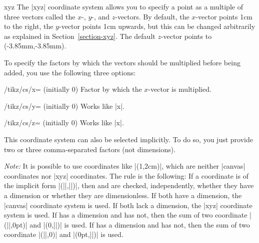 \begin{coordinatesystem}{xyz}
    The |xyz| coordinate system allows you to specify a point as a multiple of
    three vectors called the $x$-, $y$-, and $z$-vectors. By default, the
    $x$-vector points 1cm to the right, the $y$-vector points 1cm upwards, but
    this can be changed arbitrarily as explained in Section~\ref{section-xyz}.
    The default $z$-vector points to
    (-3.85mm,-3.85mm).

    To specify the factors by which the vectors should be multiplied before
    being added, you use the following three options:
    \begin{key}{/tikz/cs/x= (initially 0)}
        Factor by which the $x$-vector is multiplied.
    \end{key}
    \begin{key}{/tikz/cs/y= (initially 0)}
        Works like |x|.
    \end{key}
    \begin{key}{/tikz/cs/z= (initially 0)}
        Works like |x|.
    \end{key}

\begin{codeexample}[]
\end{codeexample}

    This coordinate system can also be selected implicitly. To do so, you just
    provide two or three comma-separated factors (not dimensions).
\begin{codeexample}[]
\end{codeexample}
\end{coordinatesystem}

\emph{Note:} It is possible to use coordinates like |(1,2cm)|, which are
neither |canvas| coordinates nor |xyz| coordinates. The rule is the following:
If a coordinate is of the implicit form |(||,||)|, then
 and  are checked, independently, whether they have a dimension
or whether they are dimensionless. If both have a dimension, the |canvas|
coordinate system is used. If both lack a dimension, the |xyz| coordinate
system is used. If  has a dimension and  has not, then the sum
of two coordinate |(||,0pt)| and |(0,||)| is used. If 
has a dimension and  has not, then the sum of two coordinate
|(||,0)| and |(0pt,||)| is used.

